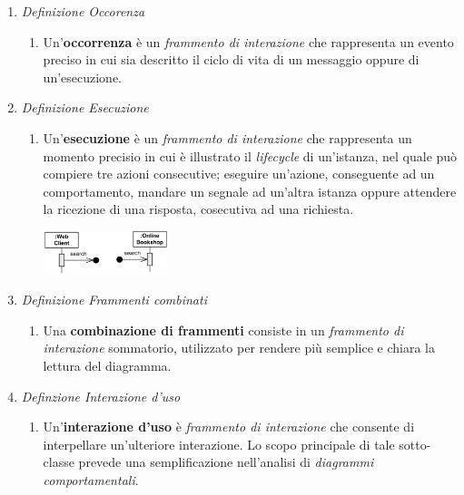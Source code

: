 \documentclass{article}
\begin{document}
\begin{enumerate}
    \renewcommand{\labelenumi}{-}
    \itemsep0em
    \item \textit{Definizione Occorenza} \begin{enumerate}[label={ }]
                        \item Un'\textbf{occorrenza} è un \textit{frammento di interazione} che rappresenta un evento preciso in cui sia descritto il ciclo di vita di un messaggio oppure di un'esecuzione.
                    \end{enumerate}
    \item \textit{Definizione Esecuzione} \begin{enumerate}[label={ }]
                        \item Un'\textbf{esecuzione} è un \textit{frammento di interazione} che rappresenta un momento precisio in cui è illustrato il \textit{lifecycle} di un'istanza, nel quale può compiere tre azioni consecutive; eseguire un'azione, conseguente ad un comportamento, mandare un segnale ad un'altra istanza oppure attendere la ricezione di una risposta, cosecutiva ad una richiesta.
                        \begin{center}
                            \includegraphics[width=0.3\textwidth]{foto 9.png}\\
                        \end{center}
                     \end{enumerate}
    \item \textit{Definizione Frammenti combinati} \begin{enumerate}[label={ }]
                                \item Una \textbf{combinazione di frammenti} consiste in un \textit{frammento di interazione} sommatorio, utilizzato per rendere più semplice e chiara la lettura del diagramma. 
                              \end{enumerate}
    \item \textit{Definzione Interazione d'uso} \begin{enumerate}[label={ }]
                                \item Un'\textbf{interazione d'uso} è \textit{frammento di interazione} che consente di interpellare un'ulteriore interazione. Lo scopo principale di tale sotto-classe prevede una semplificazione nell'analisi di \textit{diagrammi comportamentali}.\vspace*{14pt}

\end{enumerate}
\end{enumerate}
\end{document}
